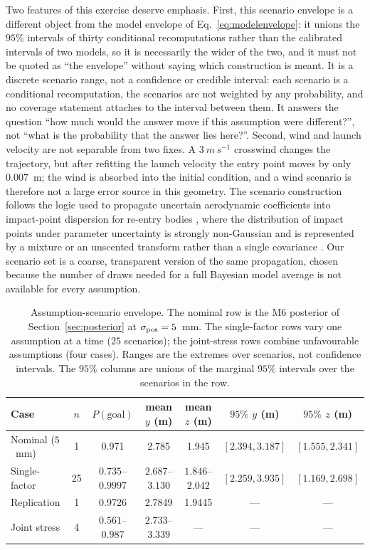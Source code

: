 Two features of this exercise deserve emphasis. First, this scenario envelope is
a different object from the model envelope of Eq.~\eqref{eq:modelenvelope}: it
unions the $95\%$ intervals of thirty conditional recomputations rather than the
calibrated intervals of two models, so it is necessarily the wider of the two,
and it must not be quoted as ``the envelope'' without saying which construction
is meant. It is a discrete scenario range, not a confidence or credible
interval: each scenario is a
conditional recomputation, the scenarios are not weighted by any probability, and
no coverage statement attaches to the interval between them. It answers the
question ``how much would the answer move if this assumption were different?'',
not ``what is the probability that the answer lies here?''. Second, wind and
launch velocity are not separable from two fixes. A $3~\si{m\,s^{-1}}$ crosswind
changes the trajectory, but after refitting the launch velocity the entry point
moves by only $0.007$~m; the wind is absorbed into the initial condition, and a
wind scenario is therefore not a large error source in this geometry. The
scenario construction follows the logic used to propagate uncertain aerodynamic
coefficients into impact-point dispersion for re-entry bodies
\citep{mehta2015}, where the distribution of impact points under parameter
uncertainty is strongly non-Gaussian and is represented by a mixture or an
unscented transform rather than a single covariance \citep{williamson2017}. Our
scenario set is a coarse, transparent version of the same propagation, chosen
because the number of draws needed for a full Bayesian model average is not
available for every assumption.

\begin{table}[t]
  \centering
  \caption{Assumption-scenario envelope. The nominal row is the M6 posterior of
  Section~\ref{sec:posterior} at $\sigma_{\rm pos}=5$~mm. The single-factor rows
  vary one assumption at a time ($25$ scenarios); the joint-stress rows combine
  unfavourable assumptions (four cases). Ranges are the extremes over scenarios,
  not confidence intervals. The $95\%$ columns are unions of the marginal $95\%$
  intervals over the scenarios in the row.}
  \label{tab:scenarios}
  \small
  \begin{tabular}{@{}lcccccc@{}}
    \toprule
    Case & $n$ & $P(\text{goal})$ & mean $y$ (m) & mean $z$ (m) & $95\%$ $y$ (m) & $95\%$ $z$ (m) \\
    \midrule
    Nominal ($5$~mm) & 1 & 0.971 & 2.785 & 1.945 & $[2.394,3.187]$ & $[1.555,2.341]$ \\
    Single-factor & 25 & $0.735$--$0.9997$ & $2.687$--$3.130$ & $1.846$--$2.042$ & $[2.259,3.935]$ & $[1.169,2.698]$ \\
    Replication & 1 & 0.9726 & 2.7849 & 1.9445 & --- & --- \\
    Joint stress & 4 & $0.561$--$0.987$ & $2.733$--$3.339$ & --- & --- & --- \\
    \bottomrule
  \end{tabular}
\end{table}

